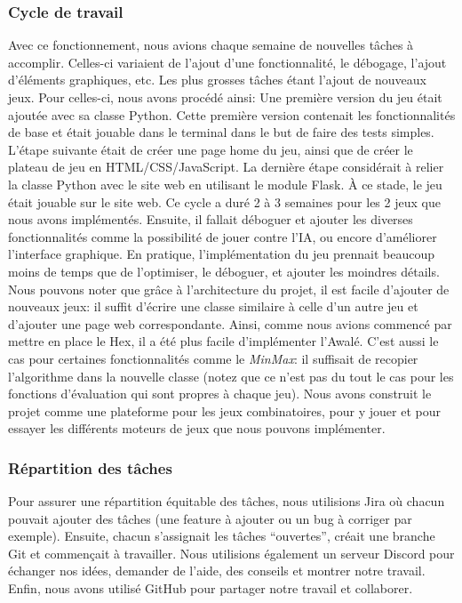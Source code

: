 \subsubsection{Cycle de travail}
Avec ce fonctionnement, nous avions chaque semaine de nouvelles tâches à accomplir. Celles-ci variaient de l'ajout d'une fonctionnalité, le débogage, l'ajout d'éléments graphiques, etc.
Les plus grosses tâches étant l'ajout de nouveaux jeux. Pour celles-ci, nous avons procédé ainsi:
Une première version du jeu était ajoutée avec sa classe Python. Cette première version contenait les fonctionnalités de base et était jouable dans le terminal dans le but de faire des tests simples. 
L'étape suivante était de créer une page home du jeu, ainsi que de créer le plateau de jeu en HTML/CSS/JavaScript. La dernière étape considérait à relier la classe 
Python avec le site web en utilisant le module Flask.
À ce stade, le jeu était jouable sur le site web. Ce cycle a duré 2 à 3 semaines pour les 2 jeux que nous avons implémentés. Ensuite, il fallait déboguer et ajouter les 
diverses fonctionnalités comme la possibilité de jouer contre l'IA, ou encore d'améliorer l'interface graphique. En pratique, l'implémentation du jeu prennait beaucoup moins de temps que de l'optimiser, 
le déboguer, et ajouter les moindres détails.
Nous pouvons noter que grâce à l'architecture du projet, il est facile d'ajouter de nouveaux jeux: il suffit d'écrire une classe similaire à celle d'un autre jeu et d'ajouter une 
page web correspondante. Ainsi, comme nous avions commencé par mettre en place le Hex, il a été plus facile d'implémenter l'Awalé.
C'est aussi le cas pour certaines fonctionnalités comme le \emph{MinMax}: il suffisait de recopier l'algorithme dans la nouvelle classe (notez que ce n'est pas du 
tout le cas pour les fonctions d'évaluation qui sont propres à chaque jeu).
Nous avons construit le projet comme une plateforme pour les jeux combinatoires, pour y jouer et pour essayer les différents moteurs de jeux que nous pouvons implémenter.

\subsubsection{Répartition des tâches}
Pour assurer une répartition équitable des tâches, nous utilisions Jira où chacun pouvait ajouter des tâches (une feature à ajouter ou un bug à corriger par exemple). 
Ensuite, chacun s'assignait les tâches ``ouvertes'', créait une branche Git et commençait à travailler. Nous utilisions également un serveur Discord pour échanger 
nos idées, demander de l'aide, des conseils et montrer notre travail. Enfin, nous avons utilisé GitHub pour partager notre travail et collaborer.



